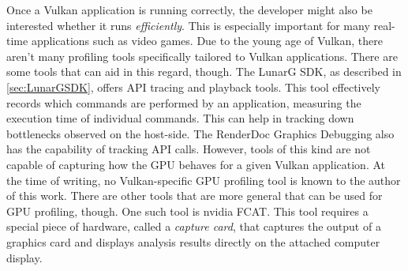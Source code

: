     Once a Vulkan application is running correctly, the developer might also be interested whether it runs \textit{efficiently}. This is especially important for many real-time applications such as video games. Due to the young age of Vulkan, there aren't many profiling tools specifically tailored to Vulkan applications. There are some tools that can aid in this regard, though. The LunarG SDK, as described in \ref{sec:LunarGSDK}, offers API tracing and playback tools. This tool effectively records which commands are performed by an application, measuring the execution time of individual commands. This can help in tracking down bottlenecks observed on the host-side. The RenderDoc Graphics Debugging\cite{renderdoc} also has the capability of tracking API calls. However, tools of this kind are not capable of capturing how the GPU behaves for a given Vulkan application. At the time of writing, no Vulkan-specific GPU profiling tool is known to the author of this work. There are other tools that are more general that can be used for GPU profiling, though. One such tool is \gls{nvidia} FCAT\cite{nvidiafcat}. This tool requires a special piece of hardware, called a \textit{capture card}, that captures the output of a graphics card and displays analysis results directly on the attached computer display.

